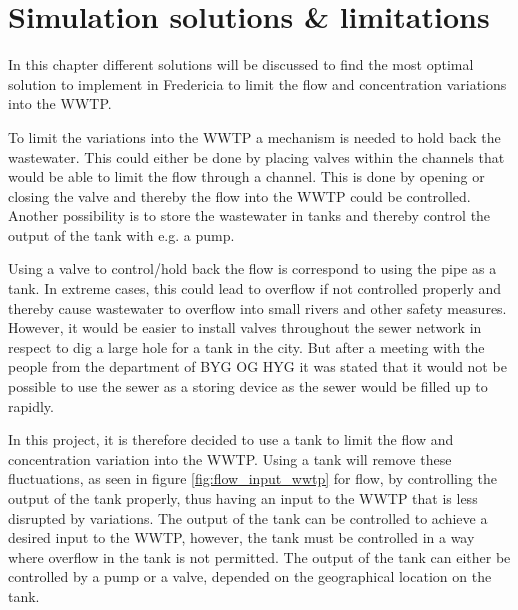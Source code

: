 
\chapter{Simulation solutions \& limitations }\label{ch:simulation_solution_and_limitation}
In this chapter different solutions will be discussed to find the most optimal solution to implement in Fredericia to limit the flow and concentration variations into the WWTP.

To limit the variations into the WWTP a mechanism is needed to hold back the wastewater. This could either be done by placing valves within the channels that would be able to limit the flow through a channel. This is done by opening or closing the valve and thereby the flow into the WWTP could be controlled. Another possibility is to store the wastewater in tanks and thereby control the output of the tank with e.g. a pump. 

Using a valve to control/hold back the flow is correspond to using the pipe as a tank. In extreme cases, this could lead to overflow if not controlled properly and thereby cause wastewater to overflow into small rivers and other safety measures. However, it would be easier to install valves throughout the sewer network in respect to dig a large hole for a tank in the city. But after a meeting with the people from the department of BYG OG HYG  it was stated that it would not be possible to use the sewer as a storing device as the sewer would be filled up to rapidly.     

In this project, it is therefore decided to use a tank to limit the flow and concentration variation into the WWTP. Using a tank will remove these fluctuations, as seen in figure \ref{fig:flow_input_wwtp} for flow, by controlling the output of the tank properly, thus having an input to the WWTP that is less disrupted by variations. The output of the tank can be controlled to achieve a desired input to the WWTP, however, the tank must be controlled in a way where overflow in the tank is not permitted. The output of the tank can either be controlled by a pump or a valve, depended on the geographical location on the tank. 